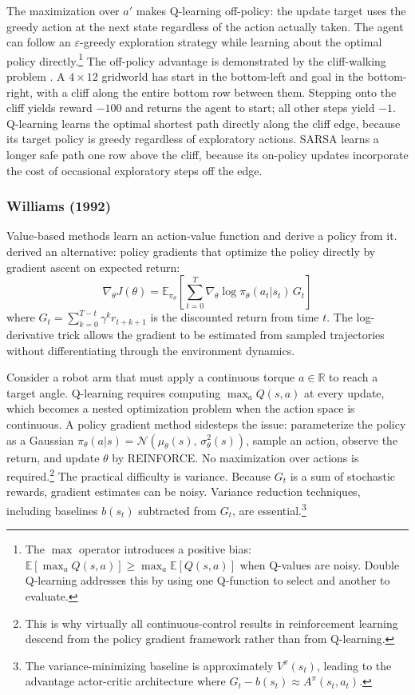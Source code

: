The maximization over $a'$ makes Q-learning off-policy: the update target uses the greedy action at the next state regardless of the action actually taken. The agent can follow an $\varepsilon$-greedy exploration strategy while learning about the optimal policy directly.\footnote{The $\max$ operator introduces a positive bias: $\mathbb{E}[\max_a Q(s,a)] \geq \max_a \mathbb{E}[Q(s,a)]$ when Q-values are noisy. Double Q-learning \citep{vanHasselt2010} addresses this by using one Q-function to select and another to evaluate.} The off-policy advantage is demonstrated by the cliff-walking problem \citep{sutton2018}. A $4 \times 12$ gridworld has start in the bottom-left and goal in the bottom-right, with a cliff along the entire bottom row between them. Stepping onto the cliff yields reward $-100$ and returns the agent to start; all other steps yield $-1$. Q-learning learns the optimal shortest path directly along the cliff edge, because its target policy is greedy regardless of exploratory actions. SARSA learns a longer safe path one row above the cliff, because its on-policy updates incorporate the cost of occasional exploratory steps off the edge.

\subsubsection{Williams (1992)}

Value-based methods learn an action-value function and derive a policy from it. \citet{williams1992} derived an alternative: policy gradients that optimize the policy directly by gradient ascent on expected return:
\begin{equation}
\nabla_\theta J(\theta) = \mathbb{E}_{\pi_\theta} \left[ \sum_{t=0}^{T} \nabla_\theta \log \pi_\theta(a_t|s_t) \, G_t \right]
\end{equation}
where $G_t = \sum_{k=0}^{T-t} \gamma^k r_{t+k+1}$ is the discounted return from time $t$. The log-derivative trick allows the gradient to be estimated from sampled trajectories without differentiating through the environment dynamics.

Consider a robot arm that must apply a continuous torque $a \in \mathbb{R}$ to reach a target angle. Q-learning requires computing $\max_a Q(s,a)$ at every update, which becomes a nested optimization problem when the action space is continuous. A policy gradient method sidesteps the issue: parameterize the policy as a Gaussian $\pi_\theta(a|s) = \mathcal{N}(\mu_\theta(s),\, \sigma_\theta^2(s))$, sample an action, observe the return, and update $\theta$ by REINFORCE. No maximization over actions is required.\footnote{This is why virtually all continuous-control results in reinforcement learning descend from the policy gradient framework rather than from Q-learning.} The practical difficulty is variance. Because $G_t$ is a sum of stochastic rewards, gradient estimates can be noisy. Variance reduction techniques, including baselines $b(s_t)$ subtracted from $G_t$, are essential.\footnote{The variance-minimizing baseline is approximately $V^\pi(s_t)$, leading to the advantage actor-critic architecture where $G_t - b(s_t) \approx A^\pi(s_t, a_t)$.}

